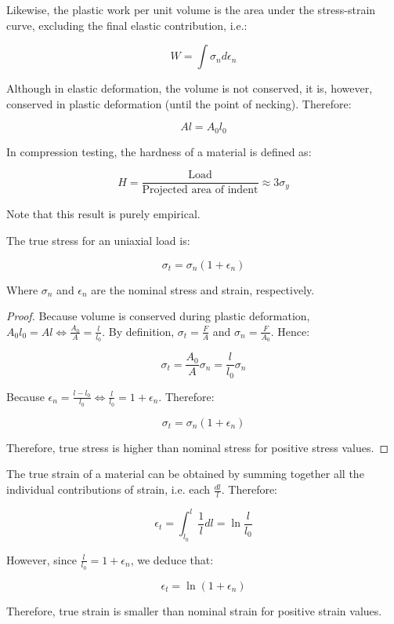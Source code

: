 \documentclass{article}
\begin{document}
Likewise, the plastic work per unit volume is the area under the stress-strain curve, excluding the final elastic contribution, i.e.:

\[ W = \int \sigma_n d\epsilon_n \]

Although in elastic deformation, the volume is not conserved, it is, however, conserved in plastic deformation (until the point of necking). Therefore:

\[ Al = A_0l_0 \]

\begin{definition}[Hardness]
    In compression testing, the hardness of a material is defined as:

    \[ H = \frac{\text{Load}}{\text{Projected area of indent}} \approx 3\sigma_y \]

    Note that this result is purely empirical.
\end{definition}

\begin{proposition}
    The true stress for an uniaxial load is:

    \[ \sigma_t = \sigma_n(1 + \epsilon_n) \]

    Where $\sigma_n$ and $\epsilon_n$ are the nominal stress and strain, respectively.
\end{proposition}

\begin{proof}
    Because volume is conserved during plastic deformation, $A_0l_0 = Al \iff \frac{A_0}{A} = \frac{l}{l_0}$.
    By definition, $\sigma_t = \frac{F}{A}$ and $\sigma_n = \frac{F}{A_0}$. Hence:

    \[ \sigma_t = \frac{A_0}{A}\sigma_n = \frac{l}{l_0}\sigma_n \]

    Because $\epsilon_n = \frac{l - l_0}{l_0} \iff \frac{l}{l_0} = 1 + \epsilon_n$. Therefore:

    \[ \sigma_t = \sigma_n(1 + \epsilon_n) \]

    Therefore, true stress is higher than nominal stress for positive stress values.
\end{proof}

\begin{proposition}
    The true strain of a material can be obtained by summing together all the individual contributions of strain, i.e. each $\frac{dl}{l}$. Therefore:

    \[ \epsilon_t = \int_{l_0}^l \frac{1}{l}dl = \ln{\frac{l}{l_0}} \]

    However, since $\frac{l}{l_0} = 1 + \epsilon_n$, we deduce that:

    \[ \epsilon_t = \ln{\left(1 + \epsilon_n\right)} \]

    Therefore, true strain is smaller than nominal strain for positive strain values.
\end{proposition}
\end{document}
